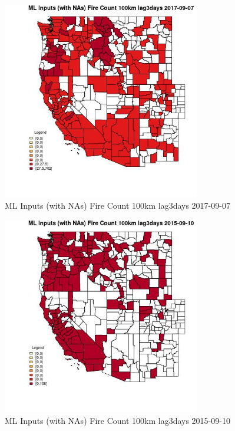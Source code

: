 \begin{figure} 
\centering  
\includegraphics[width=0.77\textwidth]{Code_Outputs/Report_ML_input_PM25_Step4_part_e_de_duplicated_aves_compiled_2019-05-20wNAs_CountyFire_Count_100km_lag3daysMean2017-09-07.jpg} 
\caption{\label{fig:Report_ML_input_PM25_Step4_part_e_de_duplicated_aves_compiled_2019-05-20wNAsCountyFire_Count_100km_lag3daysMean2017-09-07}ML Inputs (with NAs) Fire Count 100km lag3days 2017-09-07} 
\end{figure} 
 

\begin{figure} 
\centering  
\includegraphics[width=0.77\textwidth]{Code_Outputs/Report_ML_input_PM25_Step4_part_e_de_duplicated_aves_compiled_2019-05-20wNAs_CountyFire_Count_100km_lag3daysMean2015-09-10.jpg} 
\caption{\label{fig:Report_ML_input_PM25_Step4_part_e_de_duplicated_aves_compiled_2019-05-20wNAsCountyFire_Count_100km_lag3daysMean2015-09-10}ML Inputs (with NAs) Fire Count 100km lag3days 2015-09-10} 
\end{figure} 
 

